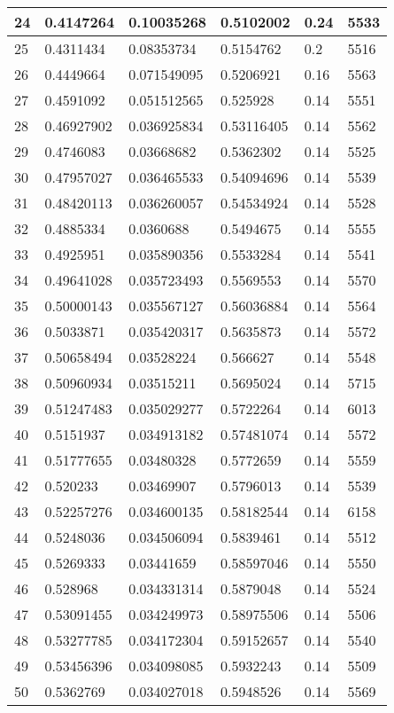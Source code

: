 \begin{longtable}{|l|l|l|l|l|l|}
24 & 0.4147264 & 0.10035268 & 0.5102002 & 0.24 & 5533 \\ \hline 
25 & 0.4311434 & 0.08353734 & 0.5154762 & 0.2 & 5516 \\ \hline 
26 & 0.4449664 & 0.071549095 & 0.5206921 & 0.16 & 5563 \\ \hline 
27 & 0.4591092 & 0.051512565 & 0.525928 & 0.14 & 5551 \\ \hline 
28 & 0.46927902 & 0.036925834 & 0.53116405 & 0.14 & 5562 \\ \hline 
29 & 0.4746083 & 0.03668682 & 0.5362302 & 0.14 & 5525 \\ \hline 
30 & 0.47957027 & 0.036465533 & 0.54094696 & 0.14 & 5539 \\ \hline 
31 & 0.48420113 & 0.036260057 & 0.54534924 & 0.14 & 5528 \\ \hline 
32 & 0.4885334 & 0.0360688 & 0.5494675 & 0.14 & 5555 \\ \hline 
33 & 0.4925951 & 0.035890356 & 0.5533284 & 0.14 & 5541 \\ \hline 
34 & 0.49641028 & 0.035723493 & 0.5569553 & 0.14 & 5570 \\ \hline 
35 & 0.50000143 & 0.035567127 & 0.56036884 & 0.14 & 5564 \\ \hline 
36 & 0.5033871 & 0.035420317 & 0.5635873 & 0.14 & 5572 \\ \hline 
37 & 0.50658494 & 0.03528224 & 0.566627 & 0.14 & 5548 \\ \hline 
38 & 0.50960934 & 0.03515211 & 0.5695024 & 0.14 & 5715 \\ \hline 
39 & 0.51247483 & 0.035029277 & 0.5722264 & 0.14 & 6013 \\ \hline 
40 & 0.5151937 & 0.034913182 & 0.57481074 & 0.14 & 5572 \\ \hline 
41 & 0.51777655 & 0.03480328 & 0.5772659 & 0.14 & 5559 \\ \hline 
42 & 0.520233 & 0.03469907 & 0.5796013 & 0.14 & 5539 \\ \hline 
43 & 0.52257276 & 0.034600135 & 0.58182544 & 0.14 & 6158 \\ \hline 
44 & 0.5248036 & 0.034506094 & 0.5839461 & 0.14 & 5512 \\ \hline 
45 & 0.5269333 & 0.03441659 & 0.58597046 & 0.14 & 5550 \\ \hline 
46 & 0.528968 & 0.034331314 & 0.5879048 & 0.14 & 5524 \\ \hline 
47 & 0.53091455 & 0.034249973 & 0.58975506 & 0.14 & 5506 \\ \hline 
48 & 0.53277785 & 0.034172304 & 0.59152657 & 0.14 & 5540 \\ \hline 
49 & 0.53456396 & 0.034098085 & 0.5932243 & 0.14 & 5509 \\ \hline 
50 & 0.5362769 & 0.034027018 & 0.5948526 & 0.14 & 5569 \\ \hline 
\end{longtable}